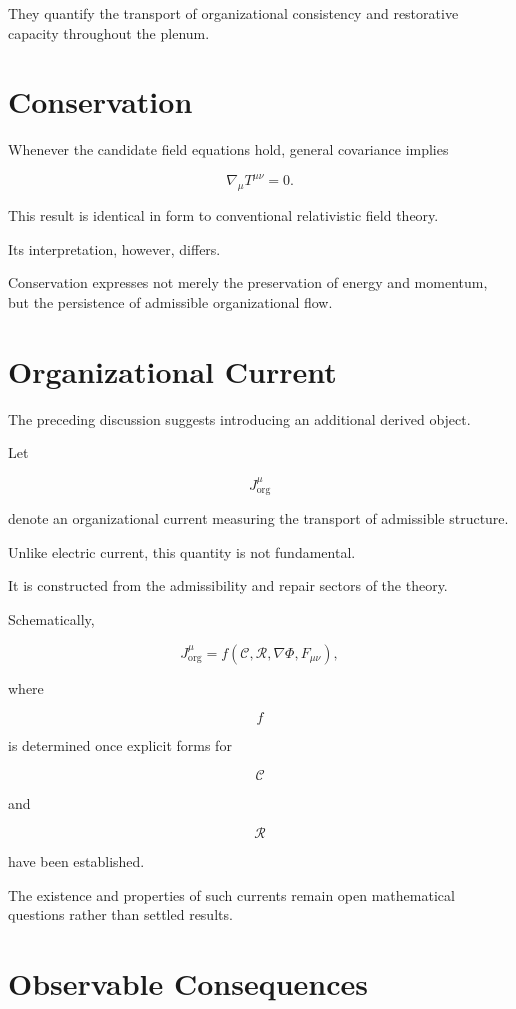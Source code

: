 \documentclass[11pt,oneside]{book}
\numberwithin{equation}{chapter}
\theoremstyle{definition}
\theoremstyle{plain}
\begin{document}
They quantify the transport of organizational consistency and restorative
capacity throughout the plenum.

\section{Conservation}

Whenever the candidate field equations hold, general covariance implies

\[
\boxed{
\nabla_\mu
T^{\mu\nu}
=
0.
}
\]

This result is identical in form to conventional relativistic field theory.

Its interpretation, however, differs.

Conservation expresses not merely the preservation of energy and momentum,
but the persistence of admissible organizational flow.

\section{Organizational Current}

The preceding discussion suggests introducing an additional derived object.

Let

\[
J^\mu_{\mathrm{org}}
\]

denote an organizational current measuring the transport of admissible
structure.

Unlike electric current, this quantity is not fundamental.

It is constructed from the admissibility and repair sectors of the theory.

Schematically,

\[
J^\mu_{\mathrm{org}}
=
f
\left(
\mathcal C,
\mathcal R,
\nabla\Phi,
F_{\mu\nu}
\right),
\]

where

\[
f
\]

is determined once explicit forms for

\[
\mathcal C
\]

and

\[
\mathcal R
\]

have been established.

The existence and properties of such currents remain open mathematical
questions rather than settled results.

\section{Observable Consequences}
\end{document}
